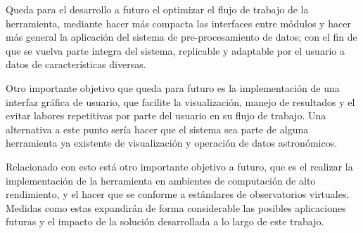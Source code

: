 \begin{conclusion}
Queda para el desarrollo a futuro el optimizar el flujo de trabajo de la herramienta, mediante hacer más compacta las interfaces entre módulos y hacer más general la aplicación del sistema de pre-procesamiento de datos; con el fin de que se vuelva parte íntegra del sistema, replicable y adaptable por el usuario a datos de características diversas. 

Otro importante objetivo que queda para futuro es la implementación de una interfaz gráfica de usuario, que facilite la visualización, manejo de resultados y el evitar labores repetitivas por parte del usuario en su flujo de trabajo. Una alternativa a este punto sería hacer que el sistema sea parte de alguna herramienta ya existente de visualización y operación de datos astronómicos.

Relacionado con esto está otro importante objetivo a futuro, que es el realizar la implementación de la herramienta en ambientes de computación de alto rendimiento, y el hacer que se conforme a estándares de observatorios virtuales. Medidas como estas expandirán de forma considerable las posibles aplicaciones futuras y el impacto de la solución desarrollada a lo largo de este trabajo.

\end{conclusion}